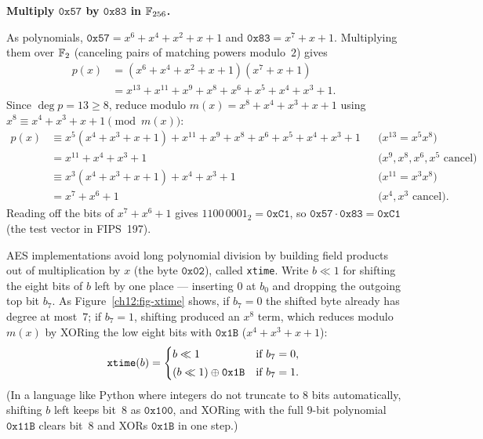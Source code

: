 \begin{walkbox}
\textbf{Multiply $\mathtt{0x57}$ by $\mathtt{0x83}$ in $\mathbb{F}_{256}$.}

As polynomials, $\mathtt{0x57} = x^6 + x^4 + x^2 + x + 1$ and
$\mathtt{0x83} = x^7 + x + 1$. Multiplying them over $\mathbb{F}_2$ (canceling pairs of
matching powers modulo~$2$) gives
\begin{align*}
p(x) &= (x^6 + x^4 + x^2 + x + 1)(x^7 + x + 1) \\
     &= x^{13} + x^{11} + x^9 + x^8 + x^6 + x^5 + x^4 + x^3 + 1.
\end{align*}
Since $\deg p = 13 \ge 8$, reduce modulo $m(x) = x^8+x^4+x^3+x+1$ using
$x^8 \equiv x^4+x^3+x+1 \pmod{m(x)}$:
\begin{align*}
p(x) &\equiv x^5(x^4+x^3+x+1) + x^{11} + x^9 + x^8 + x^6 + x^5 + x^4 + x^3 + 1
       && \text{($x^{13} = x^5 x^8$)} \\
     &= x^{11} + x^4 + x^3 + 1
       && \text{($x^9, x^8, x^6, x^5$ cancel)} \\
     &\equiv x^3(x^4+x^3+x+1) + x^4 + x^3 + 1
       && \text{($x^{11} = x^3 x^8$)} \\
     &= x^7 + x^6 + 1
       && \text{($x^4, x^3$ cancel).}
\end{align*}
Reading off the bits of $x^7 + x^6 + 1$ gives $1100\,0001_2 = \mathtt{0xC1}$, so
$\mathtt{0x57} \cdot \mathtt{0x83} = \mathtt{0xC1}$ (the test vector in FIPS~197).
\end{walkbox}

AES implementations avoid long polynomial division by building field products out
of multiplication by $x$ (the byte $\mathtt{0x02}$), called \texttt{xtime}. Write
$b \ll 1$ for shifting the eight bits of $b$ left by one place --- inserting $0$
at $b_0$ and dropping the outgoing top bit $b_7$. As Figure~\ref{ch12:fig-xtime}
shows, if $b_7 = 0$ the shifted byte already has degree at most~$7$; if $b_7 = 1$,
shifting produced an $x^8$ term, which reduces modulo $m(x)$ by XORing the low
eight bits with $\mathtt{0x1B}$ ($x^4+x^3+x+1$):
\[
\texttt{xtime}(b) =
\begin{cases}
b \ll 1 & \text{if } b_7 = 0,\\[2pt]
(b \ll 1) \oplus \mathtt{0x1B} & \text{if } b_7 = 1.
\end{cases}
\]
(In a language like Python where integers do not truncate to $8$ bits automatically,
shifting $b$ left keeps bit~$8$ as $\mathtt{0x100}$, and XORing with the full
$9$-bit polynomial $\mathtt{0x11B}$ clears bit~$8$ and XORs $\mathtt{0x1B}$ in one
step.)

